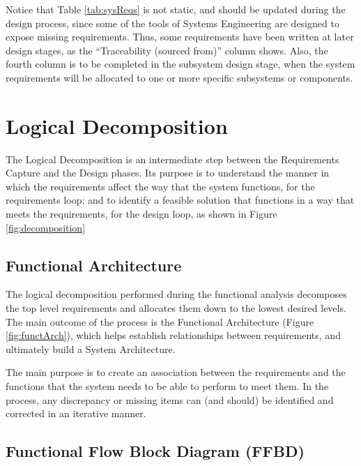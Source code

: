 

Notice that Table \ref{tab:sysReqs} is not static, and should be updated during the design process, since some of the tools of Systems Engineering are designed to expose missing requirements.
Thus, some requirements have been written at later design stages, as the ``Traceability (sourced from)'' column shows.
Also, the fourth column is to be completed in the subsystem design stage, when the system requirements will be allocated to one or more specific subsystems or components.


\section{Logical Decomposition}

The Logical Decomposition is an intermediate step between the Requirements Capture and the Design phases.
Its purpose is to understand the manner in which the requirements affect the way that the system functions, for the requirements loop; and to identify a feasible solution that functions in a way that meets the requirements, for the design loop, as shown in Figure \ref{fig:decomposition}



\subsection{Functional Architecture}

The logical decomposition performed during the functional analysis decomposes the top level requirements and allocates them down to the lowest desired levels.
The main outcome of the process is the Functional Architecture (Figure \ref{fig:functArch}), which helps establish relationships between requirements, and ultimately build a System Architecture.



The main purpose is to create an association between the requirements and the functions that the system needs to be able to perform to meet them.
In the process, any discrepancy or missing items can (and should) be identified and corrected in an iterative manner.

\subsection{Functional Flow Block Diagram (FFBD)}

